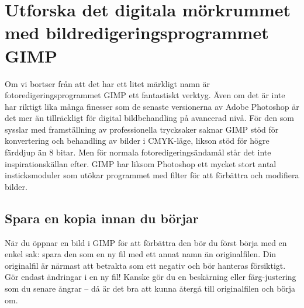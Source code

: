 \documentclass[a4paper,final]{memoir} %
\begin{document}


\section[Utforska det digitala mörkrummet med GIMP]{Utforska det digitala mörkrummet med bildredigeringsprogrammet GIMP}


Om vi bortser från att det har ett litet märkligt namn är fotoredigeringsprogrammet GIMP ett fantastiskt verktyg. Även om det är inte har riktigt lika många finesser som de senaste versionerna av Adobe Photoshop är det mer än tillräckligt för digital bildbehandling på avancerad nivå. För den som sysslar med framställning av professionella trycksaker saknar GIMP stöd för konvertering och behandling av bilder i CMYK-läge, likson stöd för högre färddjup än 8 bitar. Men för normala fotoredigeringsändamål står det inte inspirationskällan efter. GIMP har liksom Photoshop ett mycket stort antal insticksmoduler som utökar programmet med filter för att förbättra och modifiera bilder.

\label{fig:gimp}


\subsection{Spara en kopia innan du börjar}



När du öppnar en bild i GIMP för att förbättra den bör du först börja med en enkel sak: spara den som en ny fil med ett annat namn än originalfilen. Din originalfil är närmast att betrakta som ett negativ och bör hanteras försiktigt. Gör endast ändringar i en ny fil! Kanske gör du en beskärning eller färg-justering som du senare ångrar -- då är det bra att kunna återgå till originalfilen och börja om.
\end{document}
